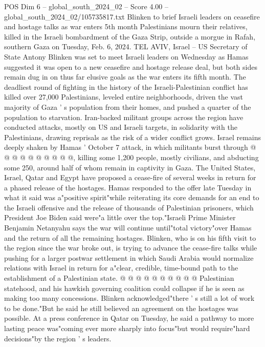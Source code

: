 \begin{textsample}{POS Dim 6 – global\_south\_2024\_02 – Score 4.00 – global\_south\_2024\_02/105735817.txt}  \label{ex:f6_pos_164}
Blinken to brief Israeli leaders on ceasefire and hostage talks as war enters 5th month Palestinians mourn their relatives, killed in the Israeli bombardment of the Gaza Strip, outside a morgue in Rafah, southern Gaza on Tuesday, Feb. 6, 2024.
TEL AVIV, Israel -- US Secretary of State Antony Blinken was set to meet Israeli leaders on Wednesday as Hamas suggested it was open to a new ceasefire and hostage release deal, but both sides remain dug in on thus far elusive goals as the war enters its fifth month.
The deadliest round of fighting in the history of the Israeli-Palestinian conflict has killed over 27,000 Palestinians, leveled entire neighborhoods, driven the vast majority of Gaza ' s population from their homes, and pushed a quarter of the population to starvation.
Iran-backed militant groups across the region have conducted attacks, mostly on US and Israeli targets, in solidarity with the Palestinians, drawing reprisals as the risk of a wider conflict grows.
Israel remains deeply shaken by Hamas ' October 7 attack, in which militants burst through @ @ @ @ @ @ @ @ @ @, killing some 1,200 people, mostly civilians, and abducting some 250, around half of whom remain in captivity in Gaza.
The United States, Israel, Qatar and Egypt have proposed a cease-fire of several weeks in return for a phased release of the hostages.
Hamas responded to the offer late Tuesday in what it said was a"positive spirit"while reiterating its core demands for an end to the Israeli offensive and the release of thousands of Palestinian prisoners, which President Joe Biden said were"a little over the top."Israeli Prime Minister Benjamin Netanyahu says the war will continue until"total victory"over Hamas and the return of all the remaining hostages.
Blinken, who is on his fifth visit to the region since the war broke out, is trying to advance the cease-fire talks while pushing for a larger postwar settlement in which Saudi Arabia would normalize relations with Israel in return for a"clear, credible, time-bound path to the establishment of a Palestinian state. @ @ @ @ @ @ @ @ @ @ Palestinian statehood, and his hawkish governing coalition could collapse if he is seen as making too many concessions.
Blinken acknowledged"there ' s still a lot of work to be done."But he said he still believed an agreement on the hostages was possible.
At a press conference in Qatar on Tuesday, he said a pathway to more lasting peace was"coming ever more sharply into focus"but would require"hard decisions"by the region ' s leaders.

\end{textsample}

